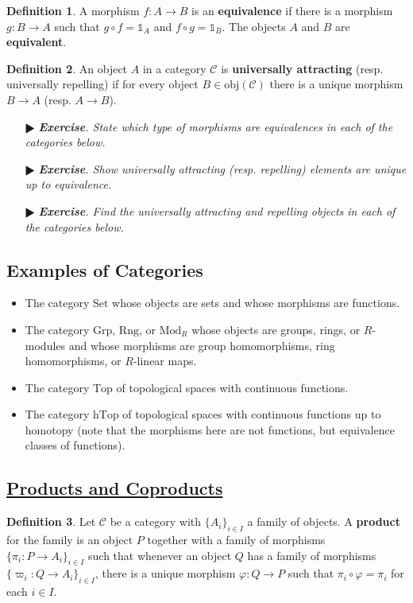 \documentclass[11pt]{amsart}
\theoremstyle{definition}
\newtheorem*{definition*}{Definition}
\renewcommand\:{\colon}
\newcommand{\calC}{\mathcal{C}}
\newcommand{\1}{\mathds{1}}
\newcommand{\Grp}{\text{Grp}}
\newcommand{\hTop}{\text{hTop}}
\newcommand{\Mod}{\text{Mod}}
\newcommand{\obj}{\text{obj}}
\newcommand{\Rng}{\text{Rng}}
\newcommand{\Set}{\text{Set}}
\newcommand{\Top}{\text{Top}}
\newcommand{\exc}[1]{\vspace{-2.5pt}\begin{itemize}[leftmargin=15pt]\item[$\RHD$] \textit{\textbf{Exercise}. #1}\end{itemize}}
\begin{document}
\begin{definition*}
	A morphism $f\: A \to B$ is an \textbf{equivalence} if there is a morphism $g\: B \to A$ such that $g \circ f = \1_A$ and $f \circ g = \1_B$. The objects $A$ and $B$ are \textbf{equivalent}.
\end{definition*}

\begin{definition*}
	An object $A$ in a category $\calC$ is \textbf{universally attracting} (resp. universally repelling) if for every object $B \in \obj(\calC)$ there is a unique morphism $B \to A$ (resp. $A \to B$).
\end{definition*}

\exc{State which type of morphisms are equivalences in each of the categories below.}
\exc{Show universally attracting \textnormal{(}resp. repelling\textnormal{)} elements are unique up to equivalence.}
\exc{Find the universally attracting and repelling objects in each of the categories below.}
\vskip10pt

\subsection*{Examples of Categories}
\vspace{-5pt}\begin{itemize}[leftmargin=*]\setlength\itemsep{0em}
	\item The category $\Set$ whose objects are sets and whose morphisms are functions.
	\item The category $\Grp$, $\Rng$, or $\Mod_R$ whose objects are groups, rings, or $R$-modules and whose morphisms are group homomorphisms, ring homomorphisms, or $R$-linear maps.
	\item The category $\Top$ of topological spaces with continuous functions.
	\item The category $\hTop$ of topological spaces with continuous functions up to homotopy (note that the morphisms here are not functions, but equivalence classes of functions).
\end{itemize}

\clearpage %

\subsection*{\underline{Products and Coproducts}}

\begin{definition*}
	Let $\calC$ be a category with $\{A_i\}_{i \in I}$ a family of objects. A \textbf{product} for the family is an object $P$ together with a family of morphisms $\{\pi_i\: P \to A_i\}_{i\in I}$ such that whenever an object $Q$ has a family of morphisms $\{\varpi_i\: Q \to A_i\}_{i \in I}$, there is a unique morphism $\varphi\: Q \to P$ such that $\pi_i \circ \varphi = \pi_i$ for each $i \in I$.
\end{definition*}
\end{document}
